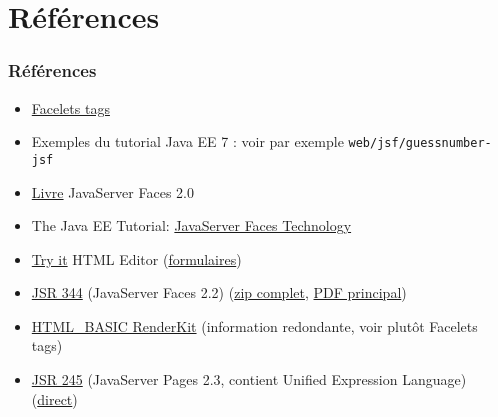 \documentclass[english, french]{beamer}
\begin{document}
\section{Références}
\begin{frame}
	\frametitle{Références}
	\begin{itemize}
		\item \href{https://docs.oracle.com/javaee/7/javaserver-faces-2-2/vdldocs-facelets/toc.htm}{Facelets tags}
		\item Exemples du tutorial Java EE 7 : voir par exemple \texttt{web/jsf/guessnumber-jsf}
		\item \href{http://gen.lib.rus.ec/book/index.php?md5=DED75FBAF79F19E9473C4EDF96EC9B57}{Livre} JavaServer Faces 2.0
		\item The Java EE Tutorial: \href{https://docs.oracle.com/javaee/7/tutorial/jsf-intro.htm}{JavaServer Faces Technology}
		\item \href{http://www.w3schools.com/tags/tryit.asp?filename=tryhtml_basic}{Try it} HTML Editor (\href{http://www.w3schools.com/tags/tryit.asp?filename=tryhtml_form_method}{formulaires})
		\item \href{https://jcp.org/en/jsr/detail?id=344}{JSR 344} (JavaServer Faces 2.2) (\href{http://download.oracle.com/otn-pub/jcp/jsf-2_2-fr-eval-spec/javax.faces-api-2.2-FINAL.zip}{zip complet}, \href{http://www.sws.bfh.ch/~fischli/courses/eadj/jsf/doc/JSF_20130320.pdf}{PDF principal})
		\item \href{https://docs.oracle.com/javaee/7/javaserver-faces-2-2/renderkitdocs/toc.htm}{HTML\_BASIC RenderKit} (information redondante, voir plutôt Facelets tags)
		\item \href{https://jcp.org/en/jsr/detail?id=245}{JSR 245} (JavaServer Pages 2.3, contient Unified Expression Language) (\href{http://download.oracle.com/otn-pub/jcp/jsp-2_3-mrel2-eval-spec/JSP2.3MR.pdf}{direct})
	\end{itemize}
\end{frame}
\end{document}
